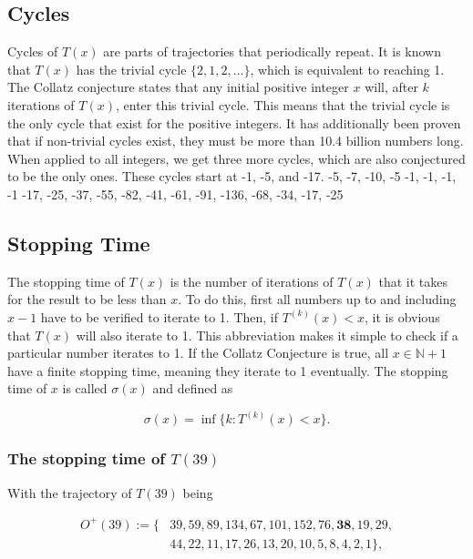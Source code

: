 \documentclass[12pt,a4paper,reqno]{amsart}
\begin{document}
\subsection{Cycles}

Cycles of $T(x)$ are parts of trajectories that periodically repeat. It is
known that $T(x)$ has the trivial cycle $\{2,1,2,\dots\}$, which is equivalent 
to reaching 1. The Collatz conjecture states that any initial positive integer
$x$ will, after $k$ iterations of $T(x)$, enter this trivial cycle. This means
that the trivial cycle is the only cycle that exist for the positive integers.
It has additionally been proven that if non-trivial cycles exist, they must be
more than 10.4 billion numbers long. \\
When applied to all integers, we get three more cycles, which are also
conjectured to be the only ones. These cycles start at -1, -5, and -17.
-5, -7, -10, -5
-1, -1, -1, -1
-17, -25, -37, -55, -82, -41, -61, -91, -136, -68, -34, -17, -25


\subsection{Stopping Time}

The stopping time of $T(x)$ is the number of iterations of $T(x)$ that it takes
for the result to be less than $x$. To do this, first all numbers up to and
including $x-1$ have to be verified to iterate to 1. Then, if $T^{(k)}(x) < x$, 
it is obvious that $T(x)$ will also iterate to 1. This abbreviation makes it
simple to check if a particular number iterates to 1. If the Collatz Conjecture 
is true, all $x \in \mathbb{N} + 1$ have a finite stopping time, meaning they
iterate to 1 eventually. The stopping time of $x$ is called $\sigma(x)$ and
defined as

\begin{equation}
    \nonumber
    \sigma(x)=\inf\{k:T^{(k)}(x) < x\}.
\end{equation}

\subsubsection{The stopping time of $T(39)$}

With the trajectory of $T(39)$ being

\begin{align}
    \nonumber
    O^+(39):=\{&39,59,89,134,67,101,152,76,\textbf{38},19,29,\\
    \nonumber
               &44,22,11,17,26,13,20,10,5,8,4,2,1\},
\end{align}
\end{document}
